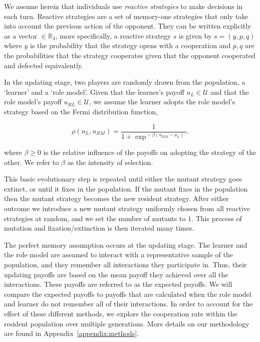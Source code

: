 \documentclass[11pt]{article}
\newcommand{\R}{\mathbb{R}}
\theoremstyle{plainCl1}
\theoremstyle{plainCl2}
\begin{document}
We assume herein that individuals use \textit{reactive strategies} to make
decisions in each turn. Reactive strategies are a set of memory-one strategies
that only take into account the previous action of the opponent. They can be
written explicitly as a vector \(\in \R_{3}\), more specifically, a reactive
strategy \(s\) is given by \(s=(y, p, q)\) where \(y\) is the probability that
the strategy opens with a cooperation and \(p, q\) are the probabilities that
the strategy cooperates given that the opponent cooperated and defected
equivalently.

In the updating stage, two players are randomly drawn from the population, a
`learner' and a `role model'. Given that the learner's payoff $u_L\!\in\!
\mathcal{U}$ and that the role model's payoff $u_{RL}\!\in\! \mathcal{U}$, we
assume the learner adopts the role model's strategy based on the Fermi
distribution function,

\begin{equation} \label{Eq:rho}
  \rho(u_{L}, u_{RM}) = \frac{1}{1\!+\! \exp^{\!-\!\beta (u_{RM}\!-\!u_{L})}}.
\end{equation}

where $\beta\!\ge\!0$ is the relative influence of the payoffs on adopting the 
strategy of the other. We refer to $\beta$ as the intensity of selection.

This basic evolutionary step is repeated until either the mutant strategy goes
extinct, or until it fixes in the population. If the mutant fixes in the
population then the mutant strategy becomes the new resident strategy. After
either outcome we introduce a new mutant strategy uniformly chosen from all
reactive strategies at random, and we set the number of mutants to $1$. This
process of mutation and fixation/extinction is then iterated many times.

The perfect memory assumption occurs at the updating stage. The learner and the
role model are assumed to interact with a representative sample of the
population, and they remember all interactions they participate in. Thus, their
updating payoffs are based on the mean payoff they achieved over all the
interactions. These payoffs are referred to as the expected payoffs. We will
compare the expected payoffs to payoffs that are calculated when the role model
and learner do not remember all of their interactions. In order to account for
the effect of these different methods, we explore the cooperation rate within
the resident population over multiple generations. More details on our
methodology are found in Appendix~\ref{appendix:methods}.
\end{document}
